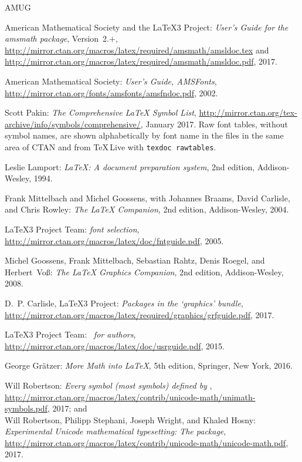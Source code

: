 \begin{thebibliography}{AMUG}
\raggedright

 American Mathematical Society and the \LaTeX3 Project:
  \emph{User's Guide for the \textnormal{\ttfamily amsmath} package},
  Version~2.$+$,
  \url{http://mirror.ctan.org/macros/latex/required/amsmath/amsldoc.tex} and
  \url{http://mirror.ctan.org/macros/latex/required/amsmath/amsldoc.pdf},
  2017.

 American Mathematical Society:
  \emph{User's Guide, AMSFonts},
  \url{http://mirror.ctan.org/fonts/amsfonts/amsfndoc.pdf}, 2002.

 Scott Pakin:
  \emph{The Comprehensive \LaTeX{} Symbol List},
  \url{http://mirror.ctan.org/tex-archive/info/symbols/comprehensive/},
  January 2017.  Raw font tables, without symbol names, are shown
  alphabetically by font name in the  files in the
  same area of CTAN and from \TeX\,Live with \texttt{texdoc rawtables}.

 Leslie Lamport: \emph{\LaTeX{}: A document
    preparation system}, 2nd edition, Addison-Wesley, 1994.

 Frank Mittelbach and Michel Goossens,
  with Johannes Braams, David Carlisle, and Chris Rowley:
  \emph{The \LaTeX{} Companion}, 2nd edition, Addison-Wesley, 2004.

 \LaTeX3 Project Team: \emph{\LaTeXe{} font
  selection}, %
  \url{http://mirror.ctan.org/macros/latex/doc/fntguide.pdf}, 2005.

 Michel Goossens, Frank Mittelbach,
  Sebastian Rahtz, Denis Roegel, and Herbert~Vo\ss:
  \emph{The \LaTeX{} Graphics Companion}, 2nd edition, Addison-Wesley, 2008.

 D.~P. Carlisle, \LaTeX3 Project:
  \emph{Packages in the `graphics' bundle}, %
  \url{http://mirror.ctan.org/macros/latex/required/graphics/grfguide.pdf},
  2017.

 \LaTeX3 Project Team: \emph{\LaTeXe~for
  authors}, %
  \url{http://mirror.ctan.org/macros/latex/doc/usrguide.pdf}, 2015.

 George Gr\"atzer: \textit{More Math into \LaTeX},
   5th edition, Springer, New York, 2016.

 Will Robertson: \emph{Every symbol
  \textup{(}most symbols\textup{)} defined by },
  \url{http://mirror.ctan.org/macros/latex/contrib/unicode-math/unimath-symbols.pdf}, 2017; and\\
  Will Robertson, Philipp Stephani, Joseph Wright, and Khaled Hosny:
  \emph{Experimental Unicode mathematical typesetting: The 
  package},
  \url{http://mirror.ctan.org/macros/latex/contrib/unicode-math/unicode-math.pdf}, 2017.

\end{thebibliography}


